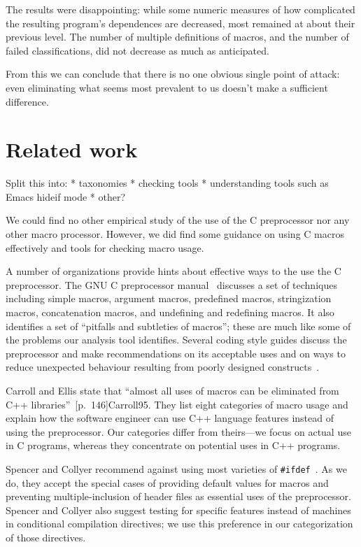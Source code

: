 \documentclass[10pt]{article}
\begin{document}
    The results were disappointing:  while some numeric measures of how
      complicated the resulting program's dependences are decreased, most
      remained at about their previous level.  The number of multiple
      definitions of macros, and the number of failed classifications, did
      not decrease as much as anticipated.

    From this we can conclude that there is no one obvious single point of
      attack:  even eliminating what seems most prevalent to us doesn't
      make a sufficient difference.



\section{Related work}
\label{sec:related}

Split this into:
 * taxonomies
 * checking tools
 * understanding tools such as Emacs hideif mode
 * other?

We could find no other empirical study of the use of the C
preprocessor nor any other macro processor.  However, we did find some
guidance on using C macros effectively and tools for checking macro
usage. 

A number of organizations provide hints about effective ways to the use
the C preprocessor.  The GNU C preprocessor manual~\cite{cpp-manual}
discusses a set of techniques including simple macros, argument macros,
predefined macros, stringization macros, concatenation macros, and
undefining and redefining macros.  It also identifies a set of
``pitfalls and subtleties of macros''; these are much like some of the
problems our analysis tool identifies.  Several coding style guides
discuss the preprocessor and make recommendations on its acceptable uses
and on ways to reduce unexpected behaviour resulting from poorly
designed constructs~\cite{Stallman97,ellemtel92,Cannon95,Dolenc90}.

Carroll and Ellis state that ``almost all uses of macros can be
eliminated from C++ libraries''~[p.~146]{Carroll95}.  They list eight
categories of macro usage and explain how the software engineer can use
C++ language features instead of using the preprocessor.  Our categories
differ from theirs---we focus on actual use in C programs, whereas they
concentrate on potential uses in C++ programs.

Spencer and Collyer recommend against using most varieties of
\texttt{\#ifdef}~\cite{SpencerC92}.  As we do, they accept the special
cases of providing default values for macros and preventing
multiple-inclusion of header files as essential uses of the
preprocessor.  Spencer and Collyer also suggest testing for specific
features instead of machines in conditional compilation directives; we
use this preference in our categorization of those directives.
\end{document}
